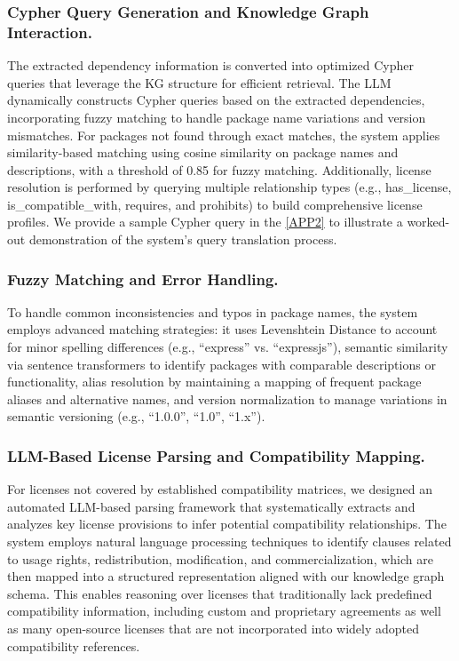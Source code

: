 \subsubsection{Cypher Query Generation and Knowledge Graph Interaction.}

The extracted dependency information is converted into optimized Cypher queries that leverage the KG structure for efficient retrieval. The LLM dynamically constructs Cypher queries based on the extracted dependencies, incorporating fuzzy matching to handle package name variations and version mismatches. For packages not found through exact matches, the system applies similarity-based matching using cosine similarity on package names and descriptions, with a threshold of 0.85 for fuzzy matching. Additionally, license resolution is performed by querying multiple relationship types (e.g., has\_license, is\_compatible\_with, requires, and prohibits) to build comprehensive license profiles.
We provide a sample Cypher query in the \ref{APP2} to illustrate a worked-out demonstration of the system’s query translation process.


\subsubsection{Fuzzy Matching and Error Handling.}

To handle common inconsistencies and typos in package names, the system employs advanced matching strategies: it uses Levenshtein Distance to account for minor spelling differences (e.g., “express” vs. “expressjs”), semantic similarity via sentence transformers to identify packages with comparable descriptions or functionality, alias resolution by maintaining a mapping of frequent package aliases and alternative names, and version normalization to manage variations in semantic versioning (e.g., “1.0.0”, “1.0”, “1.x”).

\subsubsection{LLM-Based License Parsing and Compatibility Mapping.}

For licenses not covered by established compatibility matrices, we designed an automated LLM-based parsing framework that systematically extracts and analyzes key license provisions to infer potential compatibility relationships. The system employs natural language processing techniques to identify clauses related to usage rights, redistribution, modification, and commercialization, which are then mapped into a structured representation aligned with our knowledge graph schema. This enables reasoning over licenses that traditionally lack predefined compatibility information, including custom and proprietary agreements as well as many open-source licenses that are not incorporated into widely adopted compatibility references.

